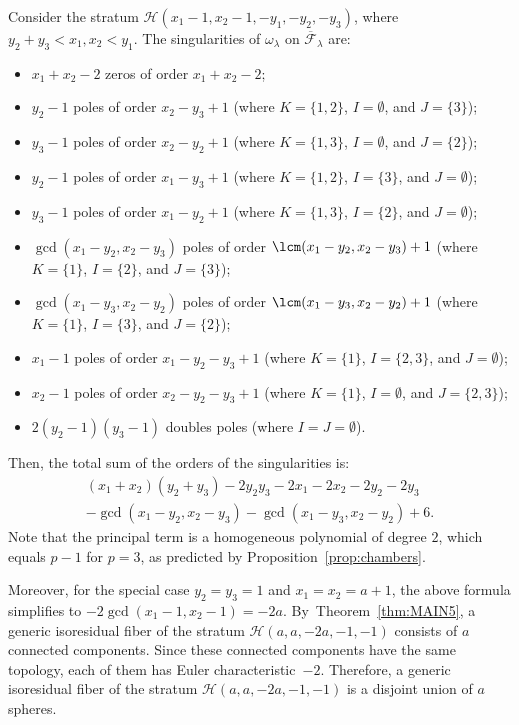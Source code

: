 \begin{ex}
Consider the stratum $\mathcal{H}(x_{1}-1,x_{2}-1,-y_{1},-y_{2},-y_{3})$, where $y_{2}+y_{3}<x_{1},x_{2}<y_{1}$. The singularities of $\omega_{\lambda}$ on $\overline{\mathcal F}_\lambda$ are:
\begin{itemize}
\item $x_{1}+x_{2}-2$ zeros of order $x_{1}+x_{2}-2$;
\item $y_{2}-1$ poles of order $x_{2}-y_{3}+1$ (where $K=\lbrace{ 1,2 \rbrace}$, $I=\emptyset$, and $J=\lbrace{ 3 \rbrace}$);
\item $y_{3}-1$ poles of order $x_{2}-y_{2}+1$ (where $K=\lbrace{ 1,3 \rbrace}$, $I=\emptyset$, and $J=\lbrace{ 2 \rbrace}$);
\item $y_{2}-1$ poles of order $x_{1}-y_{3}+1$ (where $K=\lbrace{ 1,2 \rbrace}$, $I=\lbrace{ 3 \rbrace}$, and $J=\emptyset$);
\item $y_{3}-1$ poles of order $x_{1}-y_{2}+1$ (where $K=\lbrace{ 1,3 \rbrace}$, $I=\lbrace{ 2 \rbrace}$, and $J=\emptyset$);
\item $\gcd(x_{1}-y_{2},x_{2}-y_{3})$ poles of order $\lcm(x_{1}-y_{2},x_{2}-y_{3})+1$ (where $K=\lbrace{ 1 \rbrace}$, $I=\lbrace{ 2 \rbrace}$, and $J=\lbrace{ 3 \rbrace}$);
\item $\gcd(x_{1}-y_{3},x_{2}-y_{2})$ poles of order $\lcm(x_{1}-y_{3},x_{2}-y_{2})+1$ (where $K=\lbrace{ 1 \rbrace}$, $I=\lbrace{ 3 \rbrace}$, and $J=\lbrace{ 2 \rbrace}$);
\item $x_{1}-1$ poles of order $x_{1}-y_{2}-y_{3}+1$ (where $K=\lbrace{ 1 \rbrace}$, $I=\lbrace{2,3 \rbrace}$, and $J=\emptyset$);
\item $x_{2}-1$ poles of order $x_{2}-y_{2}-y_{3}+1$ (where $K=\lbrace{ 1 \rbrace}$, $I=\emptyset$, and $J=\lbrace{2,3 \rbrace}$);
\item $2(y_{2}-1)(y_{3}-1)$ doubles poles (where $I=J=\emptyset$).
\end{itemize}
Then, the total sum of the orders of the singularities is:
\begin{multline*}
(x_{1}+x_{2})(y_{2}+y_{3})
-2y_{2}y_{3}
-2x_{1}
-2x_{2}
-2y_{2}
-2y_{3}\\
-\gcd(x_{1}-y_{2},x_{2}-y_{3})
-\gcd(x_{1}-y_{3},x_{2}-y_{2})
+6.
\end{multline*}
Note that the principal term is a homogeneous polynomial of degree $2$, which equals $p-1$ for $p=3$, as predicted by Proposition~\ref{prop:chambers}.

Moreover, for the special case $y_{2}=y_{3}=1$ and $x_1 = x_2 = a+1$, the above formula simplifies to $-2\gcd(x_{1}-1,x_{2}-1) = -2a$. By~Theorem~\ref{thm:MAIN5},
a generic isoresidual fiber of the stratum $\mathcal{H}(a,a,-2a,-1,-1)$ consists of $a$ connected components. Since these connected components have the same topology, each of them has Euler characteristic~$-2$. Therefore, a generic isoresidual fiber of the stratum $\mathcal{H}(a,a,-2a,-1,-1)$ is a disjoint union of $a$ spheres.
\end{ex}

